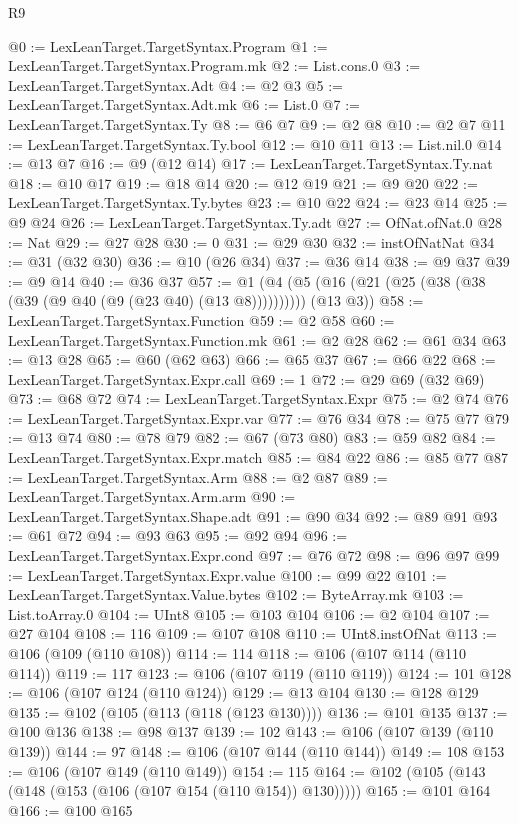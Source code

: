 \begin{lexlean}{R9}
\begin{coremodule}
@0 := LexLeanTarget.TargetSyntax.Program
@1 := LexLeanTarget.TargetSyntax.Program.mk
@2 := List.cons.{0}
@3 := LexLeanTarget.TargetSyntax.Adt
@4 := @2 @3
@5 := LexLeanTarget.TargetSyntax.Adt.mk
@6 := List.{0}
@7 := LexLeanTarget.TargetSyntax.Ty
@8 := @6 @7
@9 := @2 @8
@10 := @2 @7
@11 := LexLeanTarget.TargetSyntax.Ty.bool
@12 := @10 @11
@13 := List.nil.{0}
@14 := @13 @7
@16 := @9 (@12 @14)
@17 := LexLeanTarget.TargetSyntax.Ty.nat
@18 := @10 @17
@19 := @18 @14
@20 := @12 @19
@21 := @9 @20
@22 := LexLeanTarget.TargetSyntax.Ty.bytes
@23 := @10 @22
@24 := @23 @14
@25 := @9 @24
@26 := LexLeanTarget.TargetSyntax.Ty.adt
@27 := OfNat.ofNat.{0}
@28 := Nat
@29 := @27 @28
@30 := 0
@31 := @29 @30
@32 := instOfNatNat
@34 := @31 (@32 @30)
@36 := @10 (@26 @34)
@37 := @36 @14
@38 := @9 @37
@39 := @9 @14
@40 := @36 @37
@57 := @1 (@4 (@5 (@16 (@21 (@25 (@38 (@38 (@39 (@9 @40 (@9 (@23 @40) (@13 @8)))))))))) (@13 @3))
@58 := LexLeanTarget.TargetSyntax.Function
@59 := @2 @58
@60 := LexLeanTarget.TargetSyntax.Function.mk
@61 := @2 @28
@62 := @61 @34
@63 := @13 @28
@65 := @60 (@62 @63)
@66 := @65 @37
@67 := @66 @22
@68 := LexLeanTarget.TargetSyntax.Expr.call
@69 := 1
@72 := @29 @69 (@32 @69)
@73 := @68 @72
@74 := LexLeanTarget.TargetSyntax.Expr
@75 := @2 @74
@76 := LexLeanTarget.TargetSyntax.Expr.var
@77 := @76 @34
@78 := @75 @77
@79 := @13 @74
@80 := @78 @79
@82 := @67 (@73 @80)
@83 := @59 @82
@84 := LexLeanTarget.TargetSyntax.Expr.match
@85 := @84 @22
@86 := @85 @77
@87 := LexLeanTarget.TargetSyntax.Arm
@88 := @2 @87
@89 := LexLeanTarget.TargetSyntax.Arm.arm
@90 := LexLeanTarget.TargetSyntax.Shape.adt
@91 := @90 @34
@92 := @89 @91
@93 := @61 @72
@94 := @93 @63
@95 := @92 @94
@96 := LexLeanTarget.TargetSyntax.Expr.cond
@97 := @76 @72
@98 := @96 @97
@99 := LexLeanTarget.TargetSyntax.Expr.value
@100 := @99 @22
@101 := LexLeanTarget.TargetSyntax.Value.bytes
@102 := ByteArray.mk
@103 := List.toArray.{0}
@104 := UInt8
@105 := @103 @104
@106 := @2 @104
@107 := @27 @104
@108 := 116
@109 := @107 @108
@110 := UInt8.instOfNat
@113 := @106 (@109 (@110 @108))
@114 := 114
@118 := @106 (@107 @114 (@110 @114))
@119 := 117
@123 := @106 (@107 @119 (@110 @119))
@124 := 101
@128 := @106 (@107 @124 (@110 @124))
@129 := @13 @104
@130 := @128 @129
@135 := @102 (@105 (@113 (@118 (@123 @130))))
@136 := @101 @135
@137 := @100 @136
@138 := @98 @137
@139 := 102
@143 := @106 (@107 @139 (@110 @139))
@144 := 97
@148 := @106 (@107 @144 (@110 @144))
@149 := 108
@153 := @106 (@107 @149 (@110 @149))
@154 := 115
@164 := @102 (@105 (@143 (@148 (@153 (@106 (@107 @154 (@110 @154)) @130)))))
@165 := @101 @164
@166 := @100 @165

\end{coremodule}
\end{lexlean}
